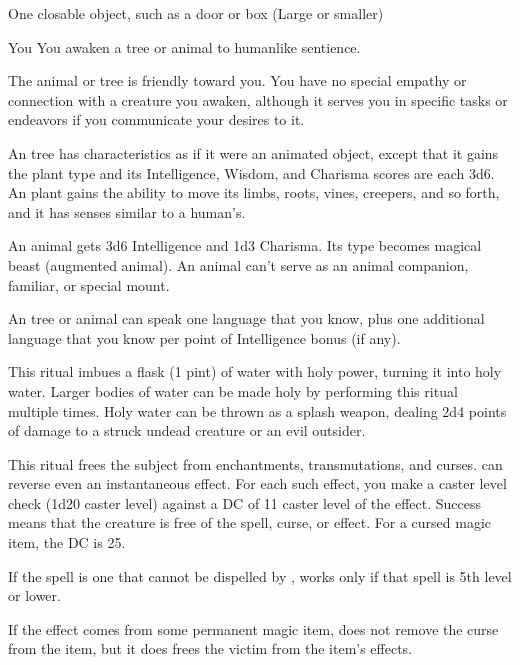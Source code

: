 \begin{spelltarget}{One closable object, such as a door or box (Large or smaller)}
\begin{spelltarget}{You}
\spelleffect You awaken a tree or animal to humanlike sentience.
\par The  animal or tree is friendly toward you. You have no special empathy or connection with a creature you awaken, although it serves you in specific tasks or endeavors if you communicate your desires to it.
\par An  tree has characteristics as if it were an animated object, except that it gains the plant type and its Intelligence, Wisdom, and Charisma scores are each 3d6. An  plant gains the ability to move its limbs, roots, vines, creepers, and so forth, and it has senses similar to a human's.
\par An  animal gets 3d6 Intelligence and \plus1d3 Charisma. Its type becomes magical beast (augmented animal). An  animal can't serve as an animal companion, familiar, or special mount.
\par An  tree or animal can speak one language that you know, plus one additional language that you know per point of Intelligence bonus (if any).

\spelleffect This ritual imbues a flask (1 pint) of water with holy power, turning it into holy water. Larger bodies of water can be made holy by performing this ritual multiple times.
\spellnotes Holy water can be thrown as a splash weapon, dealing 2d4 points of damage to a struck undead creature or an evil outsider.

\spelleffect This ritual frees the subject from enchantments, transmutations, and curses.  can reverse even an instantaneous effect. For each such effect, you make a caster level check (1d20 \add caster level) against a DC of 11 \add caster level of the effect. Success means that the creature is free of the spell, curse, or effect. For a cursed magic item, the DC is 25.
\par If the spell is one that cannot be dispelled by ,  works only if that spell is 5th level or lower.
\par If the effect comes from some permanent magic item,  does not remove the curse from the item, but it does frees the victim from the item's effects.


\end{spelltarget}
\end{spelltarget}
